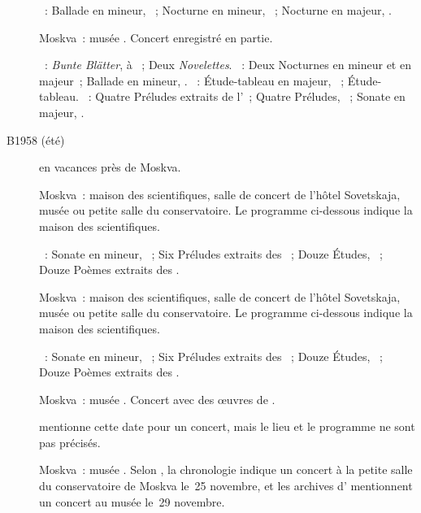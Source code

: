 \begin{description}
 \textsc{\Chopin{}}~: Ballade en \kF mineur, ~; Nocturne en \kG
 mineur,  ~; Nocturne en \kG majeur, 
 .
 \item[\DateWithWeekDay{1958-07-26}]
 Moskva~: musée \Scriabine{}.
 Concert enregistré en partie.

 \textsc{\Schumann{}}~: \emph{Bunte Blätter},   à
 ~; Deux \emph{Novelettes}.
 \textsc{\Chopin{}}~: Deux Nocturnes en \kG mineur et en \kG majeur~;
 Ballade en \kF mineur, .
 \textsc{\Rachmaninov{}}~: Étude-tableau en \kC majeur, 
 ~; Étude-tableau.
 \textsc{\Scriabine{}}~: Quatre Préludes extraits de l'~; Quatre
 Préludes, ~; Sonate en \kF \Sharp majeur, .
 \item[B1958 (été)]
 \VSofronitsky{} en vacances près de Moskva.
 \item[\DateWithWeekDay{1958-09-15}]
 Moskva~: maison des scientifiques, salle de concert de l'hôtel Sovetskaja,
 musée \Scriabine{} ou petite salle du conservatoire.
 Le programme ci-dessous indique la maison des scientifiques.

 \textsc{\Scriabine{}}~: Sonate en \kF mineur, ~; Six Préludes
 extraits des ~; Douze Études, ~; Douze Poèmes
 extraits des .
 \item[\DateWithWeekDay{1958-09-21}]
 Moskva~: maison des scientifiques, salle de concert de l'hôtel Sovetskaja,
 musée \Scriabine{} ou petite salle du conservatoire.
 Le programme ci-dessous indique la maison des scientifiques.

 \textsc{\Scriabine{}}~: Sonate en \kF mineur, ~; Six Préludes
 extraits des ~; Douze Études, ~; Douze Poèmes
 extraits des .
 \item[\DateWithWeekDay{1958-09-28}]
 Moskva~: musée \Scriabine{}.
 Concert avec des œuvres de \Scriabine{}.
 \item[\DateWithWeekDay{1958-10-29}]
 \citet[p.~181]{Nekrasova08} mentionne cette date pour un concert, mais le
 lieu et le programme ne sont pas précisés.
 \item[\DateWithWeekDay{1958-11-25}]
 Moskva~: musée \Scriabine{}.
 Selon \citet[p.~181]{Nekrasova08}, la chronologie indique un concert à la
 petite salle du conservatoire de Moskva le~25 novembre, et les archives
 d'\AVizel{} mentionnent un concert au musée \Scriabine{} le~29 novembre.


\end{description}
